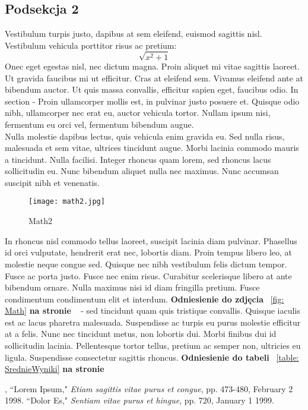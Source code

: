 \documentclass[12pt,a4paper]{article}
\begin{document}
	
	\subsection{Podsekcja 2}
	Vestibulum turpis justo, dapibus at sem eleifend, euismod sagittis nisl. Vestibulum vehicula porttitor risus ac pretium:
	\[\sqrt{x^2+1}\] 
	Onec eget egestas nisl, nec dictum magna. Proin aliquet mi vitae sagittis laoreet. Ut gravida faucibus mi ut efficitur. Cras at eleifend sem. Vivamus eleifend ante at bibendum auctor. Ut quis massa convallis, efficitur sapien eget, faucibus odio.
	In section  - Proin ullamcorper mollis est, in pulvinar justo posuere et. Quisque odio nibh, ullamcorper nec erat eu, auctor vehicula tortor. Nullam ipsum nisi, fermentum eu orci vel, fermentum bibendum augue.
	\\Nulla molestie dapibus lectus, quis vehicula enim gravida eu. Sed nulla risus, malesuada et sem vitae, ultrices tincidunt augue. Morbi lacinia commodo mauris a tincidunt. Nulla facilisi. Integer rhoncus quam lorem, sed rhoncus lacus sollicitudin eu. Nunc bibendum aliquet nulla nec maximus. Nunc accumsan suscipit nibh et venenatis. 
	\begin{figure}[H]
		\centering
		\texttt{[image: math2.jpg]}
		\caption{Math2}
		\label{fig: Math2}
	\end{figure}

	In rhoncus nisl commodo tellus laoreet, suscipit lacinia diam pulvinar. Phasellus id orci vulputate, hendrerit erat nec, lobortis diam. Proin tempus libero leo, at molestie neque congue sed. Quisque nec nibh vestibulum felis dictum tempor. Fusce ac porta justo. Fusce nec enim risus. Curabitur scelerisque libero at ante bibendum ornare. Nulla maximus nisi id diam fringilla pretium. Fusce condimentum condimentum elit et interdum. \textbf{Odniesienie do zdjęcia} ~\ref{fig: Math} \textbf{na stronie} ~\pageref{fig: Math2} - sed tincidunt quam quis tristique convallis.
	Quisque iaculis est ac lacus pharetra malesuada. Suspendisse ac turpis eu purus molestie efficitur at a felis. Nunc nec tincidunt metus, non lobortis dui. Morbi finibus dui id sollicitudin lacinia. Pellentesque tortor tellus, pretium ac semper non, ultricies eu ligula. Suspendisse consectetur sagittis rhoncus. \textbf{Odniesienie do tabeli} ~\ref{table: SrednieWyniki} \textbf{na stronie} ~\pageref{table: SrednieWyniki}
	
	\newpage
	\begin{thebibliography}{10}
		, ``Lorem Ipsum," \emph{Etiam sagittis vitae purus et congue}, pp. 473-480, February 2 1998.
		``Dolor Es," \emph{Sentiam vitae purus et hingue}, pp. 720, January 1 1999.
	\end{thebibliography}
	
\end{document}
